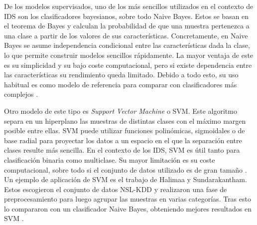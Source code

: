 De los modelos supervisados, uno de los más sencillos utilizados en el contexto de IDS son los clasificadores bayesianos, sobre todo Naive Bayes. Estos se basan en el teorema de Bayes y calculan la probabilidad de que una muestra pertenezca a una clase a partir de los valores de sus características. Concretamente, en Naive Bayes se asume independencia condicional entre las características dada la clase, lo que permite construir modelos sencillos rápidamente. La mayor ventaja de este es su simplicidad y su bajo coste computacional, pero si existe dependencia entre las características su rendimiento queda limitado. Debido a todo esto, su uso habitual es como modelo de referencia para comparar con clasificadores más complejos \cite{halimaa2019mlbasedids,wagh2013surveyids}.

Otro modelo de este tipo es \textit{Support Vector Machine} o SVM. Este algoritmo separa en un hiperplano las muestras de distintas clases con el máximo margen posible entre ellas. SVM puede utilizar funciones polinómicas, sigmoidales o de base radial para proyectar los datos a un espacio en el que la separación entre clases resulte más sencilla. En el contexto de los IDS, SVM es útil tanto para clasificación binaria como multiclase. Su mayor limitación es su coste computacional, sobre todo si el conjunto de datos utilizado es de gran tamaño \cite{halimaa2019mlbasedids,zamani2015mlids}. Un ejemplo de aplicación de SVM es el trabajo de Halimaa y Sundarakantham. Estos escogieron el conjunto de datos NSL-KDD y realizaron una fase de preprocesamiento para luego agrupar las muestras en varias categorías. Tras esto lo compararon con un clasificador Naive Bayes, obteniendo mejores resultados en SVM \cite{halimaa2019mlbasedids}.

